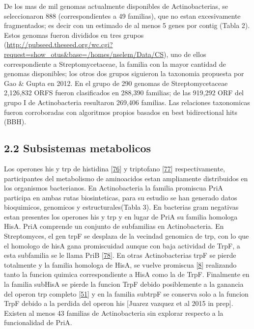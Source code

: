 \documentclass[12pt,twoside]{reedthesis}
\begin{document}
  De los mas de mil genomas actualmente disponibles de Actinobacterias, se
  seleccionaron 888 (correspondientes a 49 familias), que no estan
  excesivamente fragmentados; es decir con un estimado de al menos 5 genes
  por contig (Tabla 2). Estos genomas fueron divididos en tres grupos
  (\url{http://pubseed.theseed.org/wc.cgi?request=show_otus\&base=/homes/nselem/Data/CS}),
  uno de ellos correspondiente a Streptomycetaceae, la familia con la
  mayor cantidad de genomas disponibles; los otros dos grupos siguieron la
  taxonomia propuesta por Gao \& Gupta en 2012. En el grupo de 290 genomas
  de Streptomycetaceae 2,126,832 ORFS fueron clasificados en 288,390
  familias; de las 919,292 ORF del grupo I de Actinobacteria resultaron
  269,406 familias. Las relaciones taxonomicas fueron corroboradas con
  algoritmos propios basados en best bidirectional hits (BBH).
  
  \subsection{2.2 Subsistemas metabolicos}\label{subsistemas-metabolicos}
  
  Los operones his y trp de histidina
  {[}\protect\hyperlink{ref-fondiux5fevolutionux5f2009}{76}{]} y
  triptofano {[}\protect\hyperlink{ref-merinoux5fevolutionux5f2008}{77}{]}
  respectivamente, participantes del metabolismo de aminoacidos estan
  ampliamente distribuidos en los organismos bacterianos. En
  Actinobacteria la familia promiscua PriA participa en ambas rutas
  biosinteticas, para su estudio se han generado datos bioquimicos,
  genomicos y estructurales(Tabla 3). En bacterias gram negativas estan
  presentes los operones his y trp y en lugar de PriA su familia homologa
  HisA. PriA comprende un conjunto de subfamilias en Actinobacteria. En
  Streptomyces, el gen trpF se desplaza de la vecindad genomica de trp,
  con lo que el homologo de hisA gana promiscuidad aunque con baja
  actividad de TrpF, a esta subfamilia se le llama PriB
  {[}\protect\hyperlink{ref-verduzco-castroux5fco-occurrenceux5f2016}{78}{]}.
  En otras Actinobacterias trpF se pierde totalmente y la familia homologa
  de HisA, se vuelve promiscua
  {[}\protect\hyperlink{ref-baronagomezux5foccurrenceux5f2003}{8}{]}
  realizando tanto la funcion quimica correspondiente a HisA como la de
  TrpF. Finalmente en la familia subHisA se pierde la funcion TrpF debido
  posiblemente a la ganancia del operon trp completo
  {[}\protect\hyperlink{ref-noda-garciaux5fevolutionux5f2013}{51}{]} y en
  la familia subtrpF se conserva solo a la funcion TrpF debido a la
  perdida del operon his {[}Juarez vazquez et al 2015 in prep{]}. Existen
  al menos 43 familias de Actinobacteria sin explorar respecto a la
  funcionalidad de PriA.
  
\end{document}
